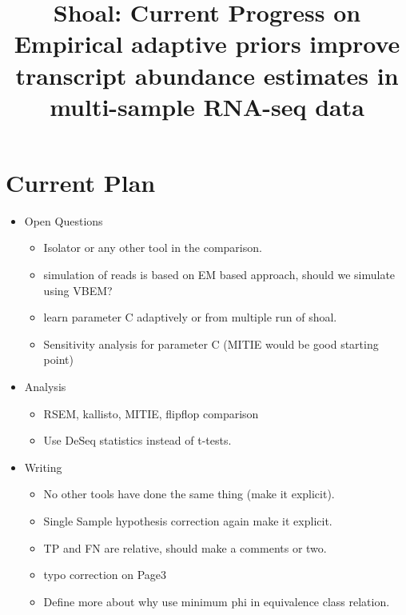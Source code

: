 \documentclass{article}
\begin{document}

\title{{Shoal: Current Progress on Empirical adaptive priors improve transcript abundance estimates in multi-sample RNA-seq data}\\ \bigskip}
\date{}

\maketitle
{}

\section{}

\section{Current Plan}
\begin{itemize}
	\item Open Questions
		\begin{itemize}
			\item Isolator or any other tool in the comparison.
			\item simulation of reads is based on EM based approach, should we simulate using VBEM?
			\item learn parameter C adaptively or from multiple run of shoal.
			\item Sensitivity analysis for parameter C (MITIE would be good starting point)
		\end{itemize}
	\item Analysis
	\begin{itemize}
		\item RSEM, kallisto, MITIE, flipflop comparison
		\item Use DeSeq statistics instead of t-tests.
	\end{itemize}
	\item Writing
	\begin{itemize}
		\item No other tools have done the same thing (make it explicit).
		\item Single Sample hypothesis correction again make it explicit.
		\item TP and FN are relative, should make a comments or two.
		\item typo correction on Page3
		\item Define more about why use minimum phi in equivalence class relation.
	\end{itemize}
\end{itemize}
\end{document}
